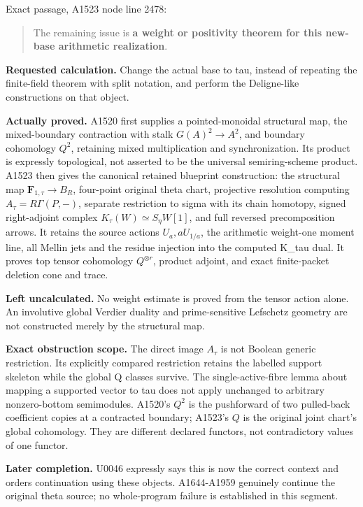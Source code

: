 \documentclass[10pt,a4paper,oneside]{report}
\begin{document}
Exact passage, A1523 node
\protect{} line 2478:

\begin{quote}
The remaining issue is \textbf{a weight or positivity theorem for this
new-base arithmetic realization}.
\end{quote}

\textbf{Requested calculation.} Change the actual base to tau, instead
of repeating the finite-field theorem with split notation, and perform
the Deligne-like constructions on that object.

\textbf{Actually proved.} A1520 first supplies a pointed-monoidal
structural map, the mixed-boundary contraction with stalk
\(G(A)^2\to A^2\), and boundary cohomology \(Q^2\), retaining mixed
multiplication and synchronization. Its product is expressly
topological, not asserted to be the universal semiring-scheme product.
A1523 then gives the canonical retained blueprint construction: the
structural map \(\mathbf F_{1,\tau}\to B_R\), four-point original theta
chart, projective resolution computing \(A_\tau=R\Gamma(P,-)\), separate
restriction to sigma with its chain homotopy, signed right-adjoint
complex \(K_\tau(W)\simeq S_\eta W[1]\), and full reversed
precomposition arrows. It retains the source actions \(U_a,aU_{1/a}\),
the arithmetic weight-one moment line, all Mellin jets and the residue
injection into the computed K\_tau dual. It proves top tensor cohomology
\(Q^{\otimes r}\), product adjoint, and exact finite-packet deletion
cone and trace.

\textbf{Left uncalculated.} No weight estimate is proved from the tensor
action alone. An involutive global Verdier duality and prime-sensitive
Lefschetz geometry are not constructed merely by the structural map.

\textbf{Exact obstruction scope.} The direct image \(A_\tau\) is not
Boolean generic restriction. Its explicitly compared restriction retains
the labelled support skeleton while the global Q classes survive. The
single-active-fibre lemma about mapping a supported vector to tau does
not apply unchanged to arbitrary nonzero-bottom semimodules. A1520's
\(Q^2\) is the pushforward of two pulled-back coefficient copies at a
contracted boundary; A1523's \(Q\) is the original joint chart's global
cohomology. They are different declared functors, not contradictory
values of one functor.

\textbf{Later completion.} U0046 expressly says this is now the correct
context and orders continuation using these objects. A1644-A1959
genuinely continue the original theta source; no whole-program failure
is established in this segment.
\end{document}
